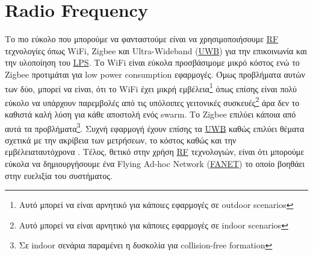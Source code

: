 


\section{Radio Frequency}
Το πιο εύκολο που μπορούμε να φανταστούμε είναι να χρησιμοποιήσουμε \hyperref[abbr:RF]{RF} τε\-χνο\-λο\-γίες
όπως WiFi, Zigbee και Ultra-Wideband (\hyperref[abbr:UWB]{UWB}) για την επικοινωνία και την υλοποίηση του \hyperref[abbr:LPS]{LPS}.   
Το WiFi είναι εύκολα προσβάσιμο\udot με μικρό κόστος ενώ το Zigbee προτιμάται για
low power consumption εφαρμογές. Όμως προβλήματα αυτών των δύο, μπορεί να είναι, ότι το 
WiFi έχει μικρή εμβέλεια\footnote{Αυτό μπορεί να είναι αρνητικό για κάποιες εφαρμογές σε outdoor scenarios} όπως επίσης είναι πολύ εύκολο 
να υπάρχουν παρεμβολές από τις υπόλοιπες γειτονικές συσκευές\footnote{Αυτό μπορεί να είναι αρνητικό για κάποιες εφαρμογές σε indoor scenarios} 
άρα δεν το καθιστά καλή λύση για κάθε αποστολή ενός swarm. Το Zigbee επιλύει κάποια από αυτά τα 
προβλήματα\footnote{Σε indoor σενάρια παραμένει η δυσκολία για collision-free formation}. Συχνή εφαρμογή έχουν επίσης 
τα \hyperref[abbr:UWB]{UWB} καθώς επιλύει θέματα σχετικά με την ακρίβεια των μετρήσεων, το κόστος καθώς και την 
εμβέλεια\udot ταυτόχρονα \cite{uwb-imu-gps3}. Τέλος, θετικό στην χρήση \hyperref[abbr:RF]{RF} τεχνολογιών, είναι ότι μπορούμε εύκολα να δημιουργήσουμε
ένα Flying Ad-hoc Network (\hyperref[abbr:FANET]{FANET}) το οποίο βοηθάει στην ευελιξία του συστήματος.

